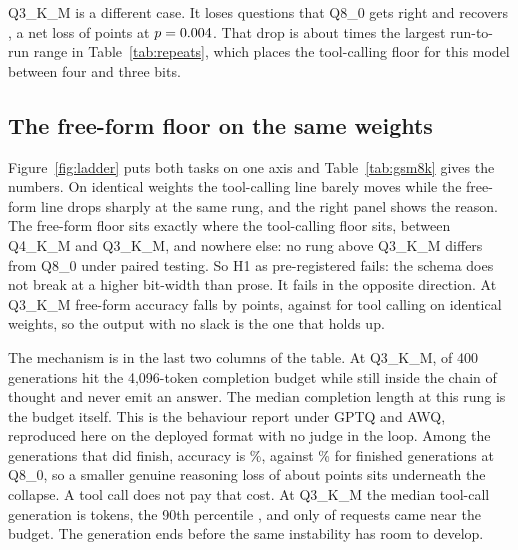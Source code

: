 \documentclass[10pt]{article}
\begin{document}
Q3\_K\_M is a different case. It loses \qtLostThree{} questions that Q8\_0 gets right and recovers \qtGainedThree{}, a net loss of \qtDropThree{} points at $p=0.004{}$. That drop is about \qtCliffOverNoise{} times the largest run-to-run range in Table~\ref{tab:repeats}, which places the tool-calling floor for this model between four and three bits.

\begin{table}[t]
\centering\small

\caption{The quantization ladder on \texttt{simple\_python}, $n=\qtN{}$ per rung, all rungs from one FP16 source. Lost and gained count questions that flip against Q8\_0; $p$ is McNemar's exact test on those discordant pairs.}
\label{tab:ladder}
\end{table}

\subsection{The free-form floor on the same weights}
\label{sec:freeform}

Figure~\ref{fig:ladder} puts both tasks on one axis and Table~\ref{tab:gsm8k} gives the numbers. On identical weights the tool-calling line barely moves while the free-form line drops sharply at the same rung, and the right panel shows the reason. The free-form floor sits exactly where the tool-calling floor sits, between Q4\_K\_M and Q3\_K\_M, and nowhere else: no rung above Q3\_K\_M differs from Q8\_0 under paired testing. So H1 as pre-registered fails: the schema does not break at a higher bit-width than prose. It fails in the opposite direction. At Q3\_K\_M free-form accuracy falls by \qtGsmDropThree{} points, against \qtDropThree{} for tool calling on identical weights, so the output with no slack is the one that holds up.

The mechanism is in the last two columns of the table. At Q3\_K\_M, \qtGsmTruncThree{} of 400 generations hit the 4{,}096-token completion budget while still inside the chain of thought and never emit an answer. The median completion length at this rung is the budget itself. This is the behaviour \citet{lotfi2026overthink} report under GPTQ and AWQ, reproduced here on the deployed format with no judge in the loop. Among the \qtGsmFinishedNThree{} generations that did finish, accuracy is \qtGsmFinishedAccThree{}\%, against \qtGsmFinishedAccEight{}\% for finished generations at Q8\_0, so a smaller genuine reasoning loss of about \qtGsmFinishedDrop{} points sits underneath the collapse. A tool call does not pay that cost. At Q3\_K\_M the median tool-call generation is \qtToolNgenMedThree{} tokens, the 90th percentile \qtToolNgenPninezeroThree{}, and only \qtToolNgenCapThree{} of \qtToolNgenReqsThree{} requests came near the budget. The generation ends before the same instability has room to develop.
\end{document}
